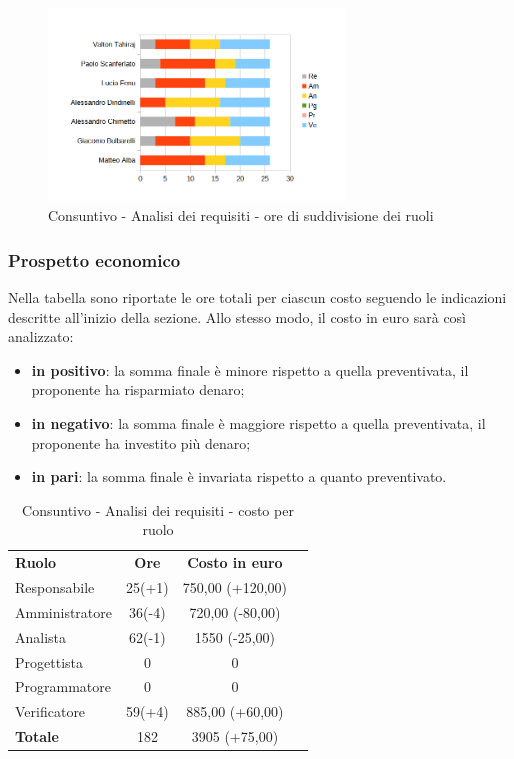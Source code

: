 	\begin{figure} [h!]
	\centering
	\includegraphics[width=0.7\textwidth]{res/img/grafici/consuntivo-barre_ ore analisi requisiti.png}
	\caption{Consuntivo - Analisi dei requisiti - ore di suddivisione dei ruoli} 
\end{figure}


\newpage
\subsubsection{Prospetto economico}
Nella tabella sono riportate le ore totali per ciascun costo seguendo le indicazioni descritte all'inizio della sezione.
Allo stesso modo, il costo in euro sarà così analizzato:
\begin{itemize}
	\item {\bfseries in positivo}: la somma finale è minore rispetto a quella preventivata, il proponente ha risparmiato denaro;
	\item {\bfseries in negativo}: la somma finale è maggiore rispetto a quella preventivata, il proponente ha investito più denaro;
	\item {\bfseries in pari}: la somma finale è invariata rispetto a quanto preventivato. \\
\end{itemize}
\begin{table} [h!]
	\begin{center}
		\begin{tabular} { m{3 cm} c c c  }
			\rowcolor{lightgray}
			\textbf{Ruolo} & \textbf{Ore} & \textbf{Costo in euro} \\
			Responsabile & 25(+1) & 750,00 (+120,00) \\
			Amministratore & 36(-4) & 720,00 (-80,00)  \\
			Analista & 62(-1) & 1550 (-25,00) \\
			Progettista & 0 & 0 \\
			Programmatore & 0 & 0  \\
			Verificatore & 59(+4) & 885,00 (+60,00)  \\
			\textbf{Totale} & 182  & 3905 (+75,00) \\
			
		\end{tabular}
		\caption{Consuntivo - Analisi dei requisiti - costo per ruolo}
	\end{center}
\end{table}

